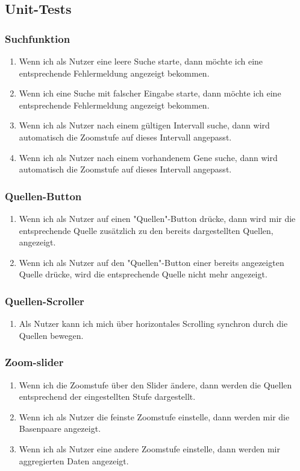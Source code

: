 \documentclass{scrartcl}
\begin{document}
\subsection{Unit-Tests}
\subsubsection{Suchfunktion}
\begin{enumerate}
	\item Wenn ich als Nutzer eine leere Suche starte, dann möchte ich eine entsprechende Fehlermeldung angezeigt bekommen.
	\item Wenn ich eine Suche mit falscher Eingabe starte, dann möchte ich eine entsprechende Fehlermeldung angezeigt bekommen.
	\item Wenn ich als Nutzer nach einem gültigen Intervall suche, dann wird automatisch die Zoomstufe auf dieses Intervall angepasst.
	\item Wenn ich als Nutzer nach einem vorhandenem Gene suche, dann wird automatisch die Zoomstufe auf dieses Intervall angepasst.
\end{enumerate}


\subsubsection{Quellen-Button}
\begin{enumerate}
	\item Wenn ich als Nutzer auf einen "Quellen"-Button drücke, dann wird mir die entsprechende Quelle zusätzlich zu den bereits dargestellten Quellen, angezeigt.
	\item Wenn ich als Nutzer auf den "Quellen"-Button einer bereits angezeigten Quelle drücke, wird die entsprechende Quelle nicht mehr angezeigt.
\end{enumerate}

\subsubsection{Quellen-Scroller}
\begin{enumerate}
	\item Als Nutzer kann ich mich über horizontales Scrolling synchron durch die Quellen bewegen.
\end{enumerate}

\subsubsection{Zoom-slider}
\begin{enumerate}
	\item Wenn ich die Zoomstufe über den Slider ändere, dann werden die Quellen entsprechend der eingestellten Stufe dargestellt.
	\item Wenn ich als Nutzer die feinste Zoomstufe einstelle, dann werden mir die Basenpaare angezeigt.
	\item Wenn ich als Nutzer eine andere Zoomstufe einstelle, dann werden mir aggregierten Daten angezeigt.
\end{enumerate}
\end{document}
